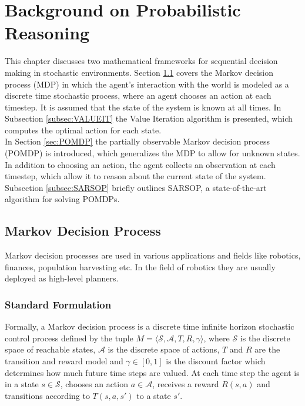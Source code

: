 \chapter{Background on Probabilistic Reasoning}
\label{chap:probabilistic}

This chapter discusses two mathematical frameworks for sequential decision making in stochastic environments. Section \ref{sec:MDP} covers the Markov decision process (MDP) in which the agent's interaction with the world is modeled as a discrete time stochastic process, where an agent chooses an action at each timestep. It is assumed that the state of the system is known at all times. In Subsection \ref{subsec:VALUEIT} the Value Iteration algorithm is presented, which computes the optimal action for each state.\\

In Section \ref{sec:POMDP} the partially observable Markov decision process (POMDP) is introduced, which generalizes the MDP to allow for unknown states. In addition to choosing an action, the agent collects an observation at each timestep, which allow it to reason about the current state of the system. Subsection \ref{subsec:SARSOP} briefly outlines SARSOP, a state-of-the-art algorithm for solving POMDPs.  
\section{Markov Decision Process}\label{sec:MDP}
Markov decision processes are used in various applications and fields like robotics, finances, population harvesting \cite{MDPsurvey} etc. In the field of robotics they are usually deployed as high-level planners. 
\subsection{Standard Formulation}\label{subsec:MDPFormulation}
Formally, a Markov decision process is a discrete time infinite horizon stochastic control process defined by the tuple $M = \langle \mathcal{S}, \mathcal{A}, T, R, \gamma \rangle$, where $\mathcal{S}$ is the discrete space of reachable states, $\mathcal{A}$ is the discrete space of actions, $T$ and $R$ are the transition and reward model and $\gamma \in [0,1]$ is the discount factor which determines how much future time steps are valued. At each time step the agent is in a state $s\in\mathcal{S}$, chooses an action $a\in\mathcal{A}$, receives a reward $R(s,a)$ and transitions according to $T(s,a,s')$ to a state $s'$.\\

